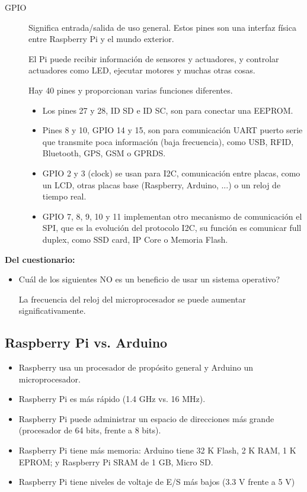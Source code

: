 \documentclass[12pt, twoside, openright]{report} %
\begin{document}
\begin{description}
	\item[GPIO] Significa entrada/salida de uso general. Estos pines son una interfaz física entre Raspberry Pi y el mundo exterior.

	      El Pi puede recibir información de sensores y actuadores, y controlar actuadores como LED, ejecutar motores y muchas otras cosas.

	      Hay 40 pines y proporcionan varias funciones diferentes.
	      \begin{itemize}
		      \item Los pines 27 y 28, ID SD e ID SC, son para conectar una EEPROM.
		      \item Pines 8 y 10, GPIO 14 y 15, son para comunicación UART puerto serie que transmite poca información (baja frecuencia), como USB, RFID, Bluetooth, GPS, GSM o GPRDS.
		      \item GPIO 2 y 3 (clock) se usan para I2C, comunicación entre placas, como un LCD, otras placas base (Raspberry, Arduino, ...) o un reloj de tiempo real.
		      \item GPIO 7, 8, 9, 10 y 11 implementan otro mecanismo de comunicación el SPI, que es la evolución del protocolo I2C, su función es comunicar full duplex, como SSD card, IP Core o Memoria Flash.
	      \end{itemize}

\end{description}
\textbf{Del cuestionario:}

\begin{itemize}
	\item Cuál de los siguientes NO es un beneficio de usar un sistema operativo?

	      La frecuencia del reloj del microprocesador se puede aumentar significativamente.
\end{itemize}

\subsection{Raspberry Pi vs. Arduino}
\begin{itemize}
	\item Raspberry usa un procesador de propósito general y Arduino un microprocesador.
	\item Raspberry Pi es más rápido (1.4 GHz vs. 16 MHz).
	\item Raspberry Pi puede administrar un espacio de direcciones más grande (procesador de 64 bits, frente a 8 bits).
	\item Raspberry Pi tiene más memoria: Arduino tiene 32 K Flash, 2 K RAM, 1 K EPROM; y Raspberry Pi SRAM de 1 GB, Micro SD.
	\item Raspberry Pi tiene niveles de voltaje de E/S más bajos (3.3 V frente a 5 V)
\end{itemize}
\end{document}
